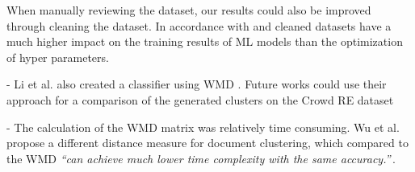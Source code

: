 When manually reviewing the dataset, our results could also be improved through cleaning the dataset. In accordance with \cite{chu_data_2016} and \cite{krishnan_data_2016}  cleaned datasets have a much higher impact on the training results of ML models than the optimization of hyper parameters. 

- Li et al. also created a classifier using WMD \cite{li_classifying_2019}. Future works could use their approach for a comparison of the generated clusters on the Crowd RE dataset

- The calculation of the WMD matrix was relatively time consuming. Wu et al. propose a different distance measure for document clustering, which compared to the WMD \textit{``can achieve much lower time complexity with the same accuracy.''}\,\cite{wu_topic_2017}.
\\[2cm]